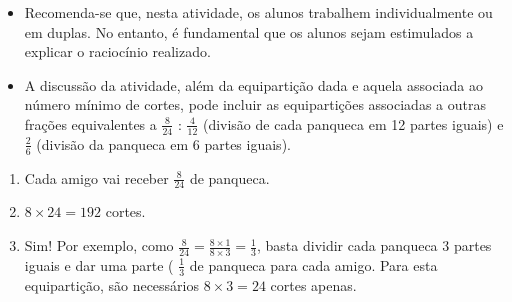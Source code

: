   
\begin{orientacoes}{}{}
\begin{itemize} %
    \item       Recomenda-se que, nesta atividade, os alunos trabalhem
individualmente ou em duplas. No entanto, é fundamental que os alunos sejam
estimulados a explicar o raciocínio realizado.
    \item       A discussão da atividade, além da equipartição dada e aquela
associada ao número mínimo de cortes, pode incluir as equipartições associadas a
outras frações equivalentes a       $\frac{8}{24}$      :       $\frac{4}{12}$
    (divisão de cada panqueca em 12 partes iguais) e       $\frac{2}{6}$
(divisão da panqueca em 6 partes iguais).
\end{itemize} %





\end{orientacoes}


\begin{solucao}{}{}
\begin{enumerate} [\quad a)] %
    \item       Cada amigo vai receber       $\frac{8}{24}$       de panqueca.
    \item             $8 \times 24 = 192$       cortes.
    \item       Sim! Por exemplo, como       $\frac{8}{24} = \frac{8 \times 1}{8
\times 3} = \frac{1}{3}$, basta dividir cada panqueca       $3$       partes
iguais e dar uma parte (      $\frac{1}{3}$       de panqueca para cada amigo.
Para esta equipartição, são necessários       $8 \times 3 = 24$       cortes
apenas.
\end{enumerate} %

\end{solucao}

